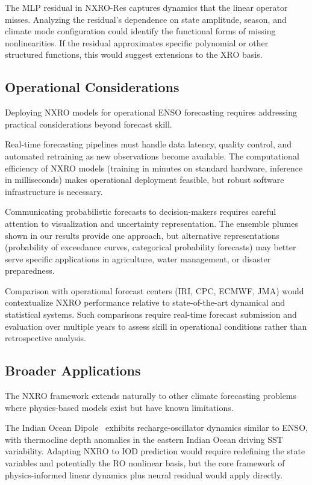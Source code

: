 The MLP residual in NXRO-Res captures dynamics that the linear operator misses. Analyzing the residual's dependence on state amplitude, season, and climate mode configuration could identify the functional forms of missing nonlinearities. If the residual approximates specific polynomial or other structured functions, this would suggest extensions to the XRO basis.

\subsection{Operational Considerations}

Deploying NXRO models for operational ENSO forecasting requires addressing practical considerations beyond forecast skill.

Real-time forecasting pipelines must handle data latency, quality control, and automated retraining as new observations become available. The computational efficiency of NXRO models (training in minutes on standard hardware, inference in milliseconds) makes operational deployment feasible, but robust software infrastructure is necessary.

Communicating probabilistic forecasts to decision-makers requires careful attention to visualization and uncertainty representation. The ensemble plumes shown in our results provide one approach, but alternative representations (probability of exceedance curves, categorical probability forecasts) may better serve specific applications in agriculture, water management, or disaster preparedness.

Comparison with operational forecast centers (IRI, CPC, ECMWF, JMA) would contextualize NXRO performance relative to state-of-the-art dynamical and statistical systems. Such comparisons require real-time forecast submission and evaluation over multiple years to assess skill in operational conditions rather than retrospective analysis.

\subsection{Broader Applications}

The NXRO framework extends naturally to other climate forecasting problems where physics-based models exist but have known limitations.

The Indian Ocean Dipole~\cite{saji1999dipole} exhibits recharge-oscillator dynamics similar to ENSO, with thermocline depth anomalies in the eastern Indian Ocean driving SST variability. Adapting NXRO to IOD prediction would require redefining the state variables and potentially the RO nonlinear basis, but the core framework of physics-informed linear dynamics plus neural residual would apply directly.

